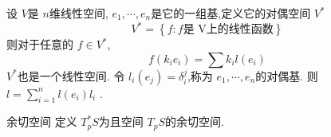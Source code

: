 \documentclass[../../古典微分几何.tex]{subfiles}
\begin{document}
\begin{definition}
    设 \(  V  \)是 \(  n  \)维线性空间, \(   e_1,\cdots,e_n   \)是它的一组基,定义它的对偶空间 \(  V^{*}  \) \[
    V^{*}= \left\{ f: f\text{是 V上的线性函数} \right\}
    \]  则对于任意的 \(  f \in V ^{*} \), \[
    f\left( k_{i}e_{i} \right)= \sum k_{i}l\left( e_{i} \right)  
    \]   \(  V^{*}  \)也是一个线性空间. 令 \(  l_{i}\left( e_{j} \right)=  \delta  _{i}^{j}   \),称为 \(   e_1,\cdots,e_n   \)的对偶基.  则 \(  l =  \sum _{i= 1}^{n}l\left( e_{i} \right)l_{i}   \) .
\end{definition}

\begin{definition}{余切空间}
    定义 \(  T_{p}^{*}S  \)为且空间 \(  T_{p}S  \)的余切空间.  
\end{definition}
\end{document}
